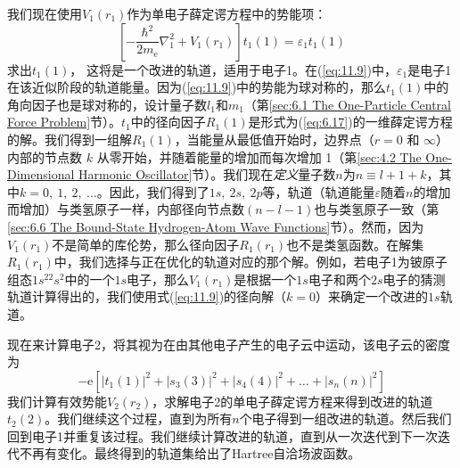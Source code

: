     我们现在使用$V_1\left(r_1\right)$作为单电子薛定谔方程中的势能项：
    \begin{equation}
        \left[-\frac{\hbar^2}{2m_{\mathrm{e}}}\nabla_1^2 + V_1\left(r_1\right)\right]t_1\left(1\right) = \varepsilon_1t_1\left(1\right)
        \label{eq:11.9}
    \end{equation}
    求出$t_1(1)$， 这将是一个改进的轨道，适用于电子1。在(\ref{eq:11.9})中，$\varepsilon_1$是电子1在该近似阶段的轨道能量。因为(\ref{eq:11.9})中的势能为球对称的，那么$t_1(1)$中的角向因子也是球对称的，设计量子数$l_1$和$m_1$（第\ref{sec:6.1 The One-Particle Central Force Problem}节）。$t_1$中的径向因子$R_1(1)$是形式为(\ref{eq:6.17})的一维薛定谔方程的解。我们得到一组解$R_1(1)$，当能量从最低值开始时，边界点（$r = 0$ 和 $\infty$）内部的节点数 $k$ 从零开始，并随着能量的增加而每次增加 1（第\ref{sec:4.2 The One-Dimensional Harmonic Oscillator}节）。我们现在\textit{定义}量子数$n$为$n \equiv l + 1 + k$，其中$k = 0,\:1,\:2,\:\ldots$。因此，我们得到了$1s, \: 2s, \: 2p$等，轨道（轨道能量$\varepsilon$随着$n$的增加而增加）与类氢原子一样，内部径向节点数$\left(n - l - 1\right)$也与类氢原子一致（第\ref{sec:6.6 The Bound-State Hydrogen-Atom Wave Functions}节）。然而，因为$V_1\left(r_1\right)$不是简单的库伦势，那么径向因子$R_1\left(r_1\right)$也不是类氢函数。在解集$R_1\left(r_1\right)$中，我们选择与正在优化的轨道对应的那个解。例如，若电子1为铍原子组态$1s^22s^2$中的一个$1s$电子，那么$V_1\left(r_1\right)$是根据一个$1s$电子和两个$2s$电子的猜测轨道计算得出的，我们使用式(\ref{eq:11.9})的径向解（$k=0$）来确定一个改进的$1s$轨道。

    现在来计算电子2，将其视为在由其他电子产生的电子云中运动，该电子云的密度为
    \begin{equation*}
        -\mathrm{e} \left[ \left| t_1 (1) \right|^2 + \left| s_3 (3) \right|^2 + \left| s_4 (4) \right|^2 + \dots + \left| s_n (n) \right|^2 \right]
    \end{equation*}
    我们计算有效势能$V_2\left(r_2\right)$，求解电子2的单电子薛定谔方程来得到改进的轨道$t_2\left(2\right)$。我们继续这个过程，直到为所有$n$个电子得到一组改进的轨道。然后我们回到电子1并重复该过程。我们继续计算改进的轨道，直到从一次迭代到下一次迭代不再有变化。最终得到的轨道集给出了Hartree自洽场波函数。

